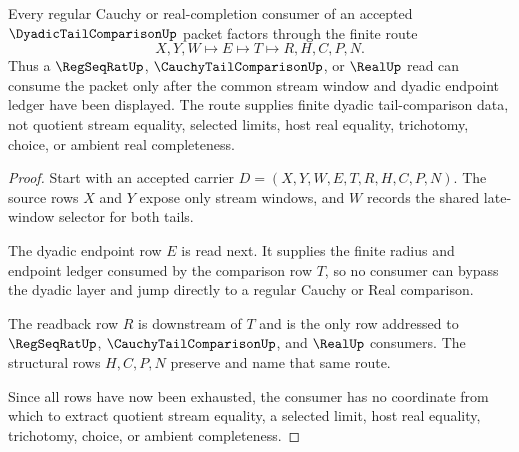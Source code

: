 \begin{theorem}
\label{thm:dyadic-tail-comparison-regular-cauchy-route}
Every regular Cauchy or real-completion consumer of an accepted $\DyadicTailComparisonUp$ packet factors through the finite route
$$
X,Y,W \longmapsto E \longmapsto T \longmapsto R,H,C,P,N .
$$
Thus a $\RegSeqRatUp$, $\CauchyTailComparisonUp$, or $\RealUp$ read can consume the packet only after the common stream window and dyadic endpoint ledger have been displayed. The route supplies finite dyadic tail-comparison data, not quotient stream equality, selected limits, host real equality, trichotomy, choice, or ambient real completeness.
\end{theorem}
\begin{proof}
Start with an accepted carrier $D=(X,Y,W,E,T,R,H,C,P,N)$. The source rows $X$ and $Y$ expose only stream windows, and $W$ records the shared late-window selector for both tails.

The dyadic endpoint row $E$ is read next. It supplies the finite radius and endpoint ledger consumed by the comparison row $T$, so no consumer can bypass the dyadic layer and jump directly to a regular Cauchy or Real comparison.

The readback row $R$ is downstream of $T$ and is the only row addressed to $\RegSeqRatUp$, $\CauchyTailComparisonUp$, and $\RealUp$ consumers. The structural rows $H,C,P,N$ preserve and name that same route.

Since all rows have now been exhausted, the consumer has no coordinate from which to extract quotient stream equality, a selected limit, host real equality, trichotomy, choice, or ambient completeness.
\end{proof}



